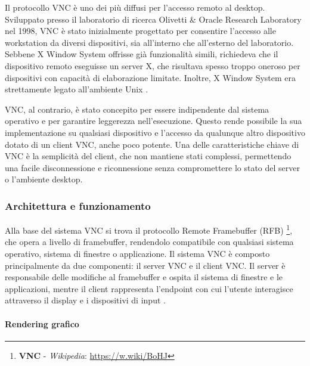 \documentclass[12pt,a4paper,openright,twoside]{book}
\begin{document}
Il protocollo \ac{VNC} è uno dei più diffusi per l'accesso remoto al desktop.
%
Sviluppato presso il laboratorio di ricerca Olivetti \& Oracle Research Laboratory nel 1998,
\ac{VNC} è stato inizialmente progettato per consentire l'accesso alle workstation da diversi dispositivi,
sia all'interno che all'esterno del laboratorio.
Sebbene X Window System offrisse già funzionalità simili, richiedeva che il dispositivo remoto eseguisse un server X,
che risultava spesso troppo oneroso per dispositivi con capacità di elaborazione limitate. Inoltre, X Window System era strettamente legato all'ambiente Unix \cite{richardson1998vnc}.

\ac{VNC}, al contrario, è stato concepito per essere indipendente dal sistema operativo e per garantire leggerezza nell'esecuzione.
Questo rende possibile la sua implementazione su qualsiasi dispositivo e l'accesso da qualunque altro dispositivo dotato di un client \ac{VNC},
anche poco potente.
%
Una delle caratteristiche chiave di \ac{VNC} è la semplicità del client, che non mantiene stati complessi,
permettendo una facile disconnessione e riconnessione senza compromettere lo stato del server o l'ambiente desktop.

\subsubsection{Architettura e funzionamento}

Alla base del sistema \ac{VNC} si trova il protocollo Remote Framebuffer (RFB)
\footnote{\textbf{\ac{VNC}} - \emph{Wikipedia}: \url{https://w.wiki/BoHJ}},
che opera a livello di framebuffer,
rendendolo compatibile con qualsiasi sistema operativo,
sistema di finestre o applicazione.
%
Il sistema \ac{VNC} è composto principalmente da due componenti:
il server \ac{VNC} e il client \ac{VNC}.
%
Il server è responsabile delle modifiche al framebuffer e ospita il sistema di finestre e le applicazioni,
mentre il client rappresenta l'endpoint con cui l'utente interagisce attraverso il display e i dispositivi di input \cite{richardson1998vnc}.

\paragraph{Rendering grafico}
\end{document}
